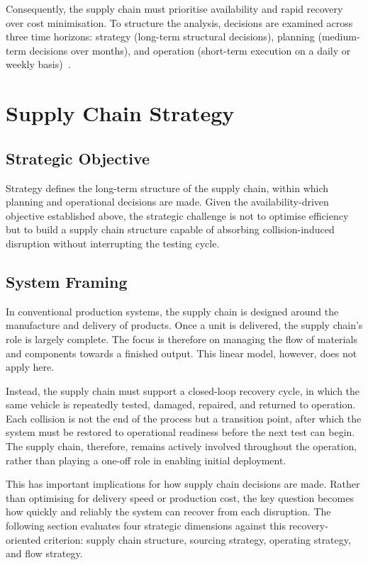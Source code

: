 \documentclass[11pt, a4paper]{report}
\numberwithin{equation}{section}
\begin{document}
\begin{refsection}
Consequently, the supply chain must prioritise availability and rapid recovery over cost minimisation. To structure the analysis, decisions are examined across three time horizons: strategy (long-term structural decisions), planning (medium-term decisions over months), and operation (short-term execution on a daily or weekly basis)~\cite{Supply_chain_lecture}.

\section{Supply Chain Strategy}

\subsection{Strategic Objective}

Strategy defines the long-term structure of the supply chain, within which planning and operational decisions are made. Given the availability-driven objective established above, the strategic challenge is not to optimise efficiency but to build a supply chain structure capable of absorbing collision-induced disruption without interrupting the testing cycle.

\subsection{System Framing}

In conventional production systems, the supply chain is designed around the manufacture and delivery of products. Once a unit is delivered, the supply chain's role is largely complete. The focus is therefore on managing the flow of materials and components towards a finished output. This linear model, however, does not apply here.

Instead, the supply chain must support a closed-loop recovery cycle, in which the same vehicle is repeatedly tested, damaged, repaired, and returned to operation. Each collision is not the end of the process but a transition point, after which the system must be restored to operational readiness before the next test can begin. The supply chain, therefore, remains actively involved throughout the operation, rather than playing a one-off role in enabling initial deployment.

This has important implications for how supply chain decisions are made. Rather than optimising for delivery speed or production cost, the key question becomes how quickly and reliably the system can recover from each disruption. The following section evaluates four strategic dimensions against this recovery-oriented criterion: supply chain structure, sourcing strategy, operating strategy, and flow strategy. %


\end{refsection}
\end{document}
